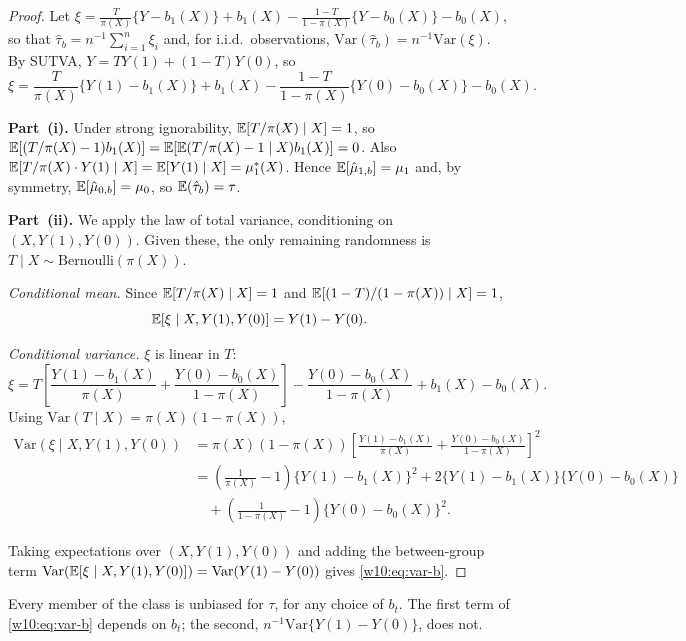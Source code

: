 \documentclass[master.tex]{subfiles}
\begin{document}
\begin{proof}
Let $\xi = \frac{T}{\pi(X)}\{Y-b_1(X)\} + b_1(X)
           - \frac{1-T}{1-\pi(X)}\{Y-b_0(X)\} - b_0(X)$,
so that $\hat\tau_b = n^{-1}\sum_{i=1}^n \xi_i$ and, for i.i.d.\
observations, $\mathrm{Var}(\hat\tau_b) = n^{-1}\mathrm{Var}(\xi)$.
By SUTVA, $Y = TY(1)+(1-T)Y(0)$, so
\[
  \xi = \frac{T}{\pi(X)}\{Y(1)-b_1(X)\} + b_1(X)
        - \frac{1-T}{1-\pi(X)}\{Y(0)-b_0(X)\} - b_0(X).
\]

\noindent\textbf{Part~(i).}  Under strong ignorability,
$\mathbb{E}[T/\pi(X)\mid X] = 1$, so
$\mathbb{E}[(T/\pi(X)-1)b_1(X)] = \mathbb{E}[\mathbb{E}(T/\pi(X)-1\mid X)b_1(X)] = 0$.
Also $\mathbb{E}[T/\pi(X)\cdot Y(1)\mid X] = \mathbb{E}[Y(1)\mid X] = \mu_1^*(X)$.
Hence $\mathbb{E}[\hat\mu_{1,b}] = \mu_1$ and, by symmetry,
$\mathbb{E}[\hat\mu_{0,b}] = \mu_0$, so $\mathbb{E}(\hat\tau_b) = \tau$.

\medskip\noindent\textbf{Part~(ii).}
We apply the law of total variance, conditioning on
$(X, Y(1), Y(0))$.  Given these, the only remaining randomness
is $T \mid X \sim \mathrm{Bernoulli}(\pi(X))$.

\emph{Conditional mean.}
Since $\mathbb{E}[T/\pi(X)\mid X]=1$ and $\mathbb{E}[(1-T)/(1-\pi(X))\mid X]=1$,
\[
  \mathbb{E}[\xi \mid X, Y(1), Y(0)] = Y(1) - Y(0).
\]

\emph{Conditional variance.}
$\xi$ is linear in $T$:
\[
  \xi = T\!\left[
           \frac{Y(1)-b_1(X)}{\pi(X)}
           + \frac{Y(0)-b_0(X)}{1-\pi(X)}
        \right]
        - \frac{Y(0)-b_0(X)}{1-\pi(X)} + b_1(X) - b_0(X).
\]
Using $\mathrm{Var}(T\mid X) = \pi(X)(1-\pi(X))$,
\begin{align}
  \mathrm{Var}(\xi \mid X, Y(1), Y(0))
  &= \pi(X)(1\!-\!\pi(X))
     \left[\frac{Y(1)-b_1(X)}{\pi(X)}+\frac{Y(0)-b_0(X)}{1-\pi(X)}\right]^{\!2}
     \nonumber \\
  &= \left(\frac{1}{\pi(X)}-1\right)\{Y(1)-b_1(X)\}^2
     + 2\{Y(1)-b_1(X)\}\{Y(0)-b_0(X)\}
     \nonumber \\
  &\quad + \left(\frac{1}{1-\pi(X)}-1\right)\{Y(0)-b_0(X)\}^2.
  \label{w10:eq:cond-var-xi}
\end{align}

Taking expectations over $(X, Y(1), Y(0))$ and adding the between-group
term $\mathrm{Var}(\mathbb{E}[\xi\mid X,Y(1),Y(0)]) = \mathrm{Var}(Y(1)-Y(0))$
gives \eqref{w10:eq:var-b}.
\end{proof}

Every member of the class is unbiased for $\tau$, for any choice of
$b_t$.  The first term of \eqref{w10:eq:var-b} depends on $b_t$;
the second, $n^{-1}\mathrm{Var}\{Y(1)-Y(0)\}$, does not.
\end{document}
